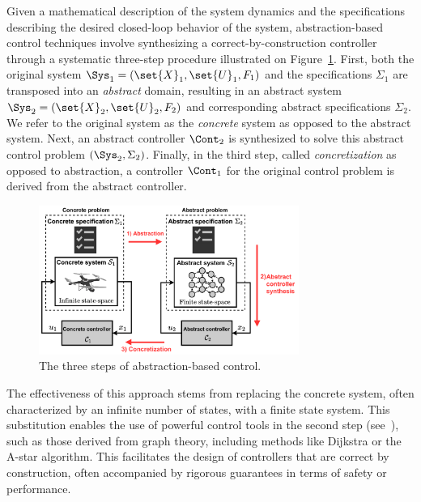 \documentclass{juliacon}
\begin{document}
Given a mathematical description of the system dynamics and the specifications describing the desired closed-loop behavior of the system, abstraction-based control techniques involve synthesizing a correct-by-construction controller through a systematic three-step procedure illustrated on Figure~\ref{fig:abstraction-procedure}. 
First, both the original system $\Sys_1=(\set{X}_1,\set{U}_1,F_1)$ and the specifications $\Sigma_1$ are transposed into an \emph{abstract} domain, resulting in an abstract system $\Sys_2=(\set{X}_2,\set{U}_2,F_2)$ and corresponding abstract specifications $\Sigma_2$. We refer to the original system as the \emph{concrete} system as opposed to the abstract system. 
Next, an abstract controller $\Cont_2$ is synthesized to solve this abstract control problem $(\Sys_2,\Sigma_2)$. 
Finally, in the third step, called \emph{concretization} as opposed to abstraction, a controller $\Cont_1$ for the original control problem is derived from the abstract controller.

\begin{figure}[ht!]
\centerline{\includegraphics[width=8.5cm]{Figures/Abstraction/Abstraction-based-control.pdf}}
\caption{The three steps of abstraction-based control.}
    \label{fig:abstraction-procedure}
\end{figure}

\vskip 6pt
The effectiveness of this approach stems from replacing the concrete system, often characterized by an infinite number of states, with a finite state system. This substitution enables the use of powerful control tools in the second step (see~\cite{belta2017formal,kupferman2001model}), such as those derived from graph theory, including methods like Dijkstra or the A-star algorithm. This facilitates the design of controllers that are correct by construction, often accompanied by rigorous guarantees in terms of safety or performance.
\end{document}

